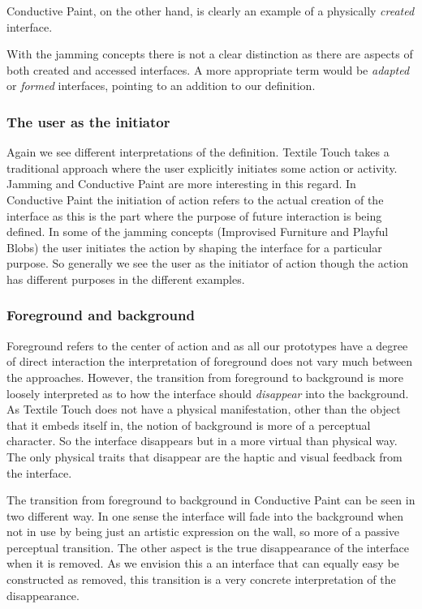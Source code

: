 Conductive Paint, on the other hand, is clearly an example of a physically \emph{created} interface.

With the jamming concepts there is not a clear distinction as there are aspects of both created and accessed interfaces.
A more appropriate term would be \emph{adapted} or \emph{formed} interfaces, pointing to an addition to our definition.

\subsubsection{The user as the initiator} 
Again we see different interpretations of the definition.
Textile Touch takes a traditional approach where the user explicitly initiates some action or activity.
Jamming and Conductive Paint are more interesting in this regard.
In Conductive Paint the initiation of action refers to the actual creation of the interface as this is the part where the purpose of future interaction is being defined.
In some of the jamming concepts (Improvised Furniture and Playful Blobs) the user initiates the action by shaping the interface for a particular purpose.
So generally we see the user as the initiator of action though the action has different purposes in the different examples.

\subsubsection{Foreground and background}
Foreground refers to the center of action and as all our prototypes have a degree of direct interaction the interpretation of foreground does not vary much between the approaches.
However, the transition from foreground to background is more loosely interpreted as to how the interface should \emph{disappear} into the background.
As Textile Touch does not have a physical manifestation, other than the object that it embeds itself in, the notion of background is more of a perceptual character.
So the interface disappears but in a more virtual than physical way.
The only physical traits that disappear are the haptic and visual feedback from the interface.

The transition from foreground to background in Conductive Paint can be seen in two different way.
In one sense the interface will fade into the background when not in use by being just an artistic expression on the wall, so more of a passive perceptual transition.
The other aspect is the true disappearance of the interface when it is removed.
As we envision this a an interface that can equally easy be constructed as removed, this transition is a very concrete interpretation of the disappearance.

